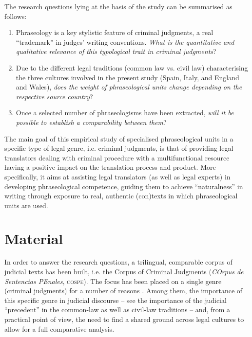 \documentclass[output=paper]{LSP/langsci}
\begin{document}
The research questions lying at the basis of the study can be summarised as follows:

\begin{enumerate}
\item Phraseology is a key stylistic feature of criminal judgments, a real “trademark” in judges’ writing conventions. \textit{What is the quantitative and qualitative relevance of this typological trait in criminal judgments}? 
\item Due to the different legal traditions (common law vs. civil law) characterising the three cultures involved in the present study (Spain, Italy, and England and Wales), \textit{does the weight of phraseological units change depending on the respective source country}? 
\item Once a selected number of phraseologisms have been extracted, \textit{will it be possible to establish a comparability between them}?
\end{enumerate}

The main goal of this empirical study of specialised phraseological units in a specific type of legal genre, i.e. criminal judgments, is that of providing legal translators dealing with criminal procedure with a multifunctional resource having a positive impact on the translation process and product. More specifically, it aims at assisting legal translators (as well as legal experts) in developing phraseological competence, guiding them to achieve “naturalness” in writing through exposure to real, authentic (con)texts in which phraseological units are used.

\section{Material}
In order to answer the research questions, a trilingual, comparable corpus of judicial texts has been built, i.e. the Corpus of Criminal Judgments (\textit{COrpus de Sentencias PEnales}, \textsc{cospe}). The focus has been placed on a single genre (criminal judgments) for a number of reasons \citep[see][171--181]{Pontrandolfo2013a}. Among them, the importance of this specific genre in judicial discourse – see the importance of the judicial “precedent” in the common-law as well as civil-law traditions – and, from a practical point of view, the need to find a shared ground across legal cultures to allow for a full comparative analysis.
\end{document}
